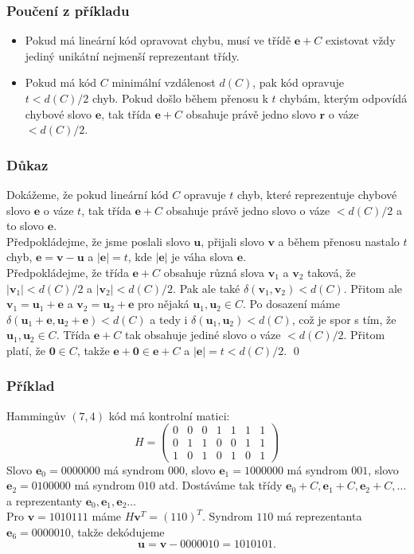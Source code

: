 \documentclass{beamer}
\newcommand{\vu}{\textbf{u}}
\newcommand{\vv}{\textbf{v}}
\newcommand{\e}{\textbf{e}}
\newcommand{\vr}{\textbf{r}}
\newcommand{\zero}{\textbf{0}}
\newcommand{\emptyline}{\\$\,$\\}
\newenvironment{itemizey}%
  {\large \begin{itemize}%
    \setlength{\itemsep}{6pt}%
    \setlength{\parskip}{6pt}}%
  {\end{itemize}}
\begin{document}
\begin{frame}[t,fragile]\frametitle{Poučení z příkladu} 
    \begin{itemizey}
        \item Pokud má lineární kód opravovat chybu, musí ve třídě $\e+C$ existovat vždy jediný unikátní nejmenší reprezentant třídy.
        \item Pokud má kód $C$ minimální vzdálenost $d(C)$, pak kód opravuje $t<d(C)/2$ chyb. Pokud došlo během přenosu k $t$ chybám, kterým odpovídá chybové slovo $\e$, tak třída $\e+C$ obsahuje právě jedno slovo $\vr$ o váze $<d(C)/2$.
    \end{itemizey}
\end{frame}


\begin{frame}[t,fragile]\frametitle{Důkaz} 
Dokážeme, že pokud lineární kód $C$ opravuje $t$ chyb, které reprezentuje chybové slovo $\e$ o váze $t$, tak třída $\e+C$ obsahuje právě jedno slovo o váze $<d(C)/2$ a to slovo $\e$.
\emptyline
Předpokládejme, že jsme poslali slovo $\vu$, přijali slovo $\vv$ a během přenosu nastalo $t$ chyb, $\e=\vv-\vu$ a $|\e|=t$, kde $|\e|$ je váha slova $\e$.
\emptyline
Předpokládejme, že třída $\e+C$ obsahuje různá slova $\vv_1$ a $\vv_2$ taková, že $|\vv_1|<d(C)/2$ a $|\vv_2|<d(C)/2$. Pak ale také $\delta(\vv_1, \vv_2)<d(C)$. Přitom ale $\vv_1=\vu_1+\e$ a $\vv_2=\vu_2+\e$ pro nějaká $\vu_1, \vu_2\in C$. Po dosazení máme $\delta(\vu_1+\e, \vu_2+\e)<d(C)$ a tedy i $\delta(\vu_1, \vu_2)<d(C)$, což je spor s tím, že $\vu_1, \vu_2\in C$. Třída $\e+C$ tak obsahuje jediné slovo o váze $<d(C)/2$. Přitom platí, že $\zero\in C$, takže $\e+\zero\in\e+C$ a $|\e|=t<d(C)/2$. \qed
\end{frame}


\begin{frame}[t,fragile]\frametitle{Příklad} 
Hammingův $(7,4)$ kód má kontrolní matici: 
$$
H=\begin{pmatrix}
0&0&0&1&1&1&1\\
0&1&1&0&0&1&1\\
1&0&1&0&1&0&1
\end{pmatrix}
$$
Slovo $\e_0=0000000$ má syndrom $000$, slovo $\e_1=1000000$ má syndrom $001$, slovo $\e_2=0100000$ má syndrom $010$ atd. Dostáváme tak třídy $\e_0+C, \e_1+C, \e_2+C,\dots$ a reprezentanty $\e_0, \e_1, \e_2\dots$
\emptyline
Pro $\vv=1010111$ máme $H\vv^T=(110)^T$. Syndrom $110$ má reprezentanta $\e_6=0000010$, takže dekódujeme
$$
\vu=\vv-0000010=1010101.
$$
\end{frame}
\end{document}
